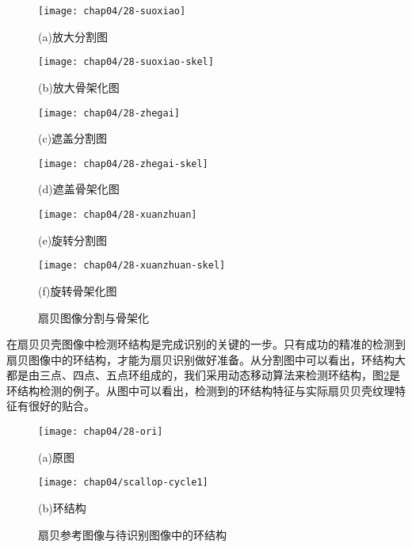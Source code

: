 \begin{figure}
\centering
  \begin{minipage}[b]{0.48\textwidth} 
      \centering 
      \texttt{[image: chap04/28-suoxiao]}
        \centerline{(a)放大分割图}\medskip
    \end{minipage}
  \begin{minipage}[b]{0.48\textwidth}
    \centering
    \texttt{[image: chap04/28-suoxiao-skel]}
      \centerline{(b)放大骨架化图}\medskip
    \end{minipage}
  \begin{minipage}[b]{0.48\textwidth} 
      \centering 
      \texttt{[image: chap04/28-zhegai]}
        \centerline{(c)遮盖分割图}\medskip
    \end{minipage}
  \begin{minipage}[b]{0.48\textwidth}
    \centering
    \texttt{[image: chap04/28-zhegai-skel]}
      \centerline{(d)遮盖骨架化图}\medskip
  \end{minipage}
  \begin{minipage}[b]{0.48\textwidth} 
      \centering 
      \texttt{[image: chap04/28-xuanzhuan]}
        \centerline{(e)旋转分割图}\medskip
    \end{minipage}
  \begin{minipage}[b]{0.48\textwidth}
    \centering
    \texttt{[image: chap04/28-xuanzhuan-skel]}
      \centerline{(f)旋转骨架化图}\medskip
  \end{minipage}
\caption{扇贝图像分割与骨架化}
\label{fig:seg-skel}
\end{figure}

在扇贝贝壳图像中检测环结构是完成识别的关键的一步。只有成功的精准的检测到扇贝图像中的环结构，才能为扇贝识别做好准备。从分割图中可以看出，环结构大都是由三点、四点、五点环组成的，我们采用动态移动算法来检测环结构，图\ref{fig:scallop-cycle}是环结构检测的例子。从图中可以看出，检测到的环结构特征与实际扇贝贝壳纹理特征有很好的贴合。

\begin{figure}
\centering
  \begin{minipage}[b]{0.48\textwidth} 
      \centering 
      \texttt{[image: chap04/28-ori]}
        \centerline{(a)原图}\medskip
    \end{minipage}
  \begin{minipage}[b]{0.48\textwidth}
    \centering
    \texttt{[image: chap04/scallop-cycle1]}
      \centerline{(b)环结构}\medskip
    \end{minipage}
\caption{扇贝参考图像与待识别图像中的环结构}
\label{fig:scallop-cycle}
\end{figure}


